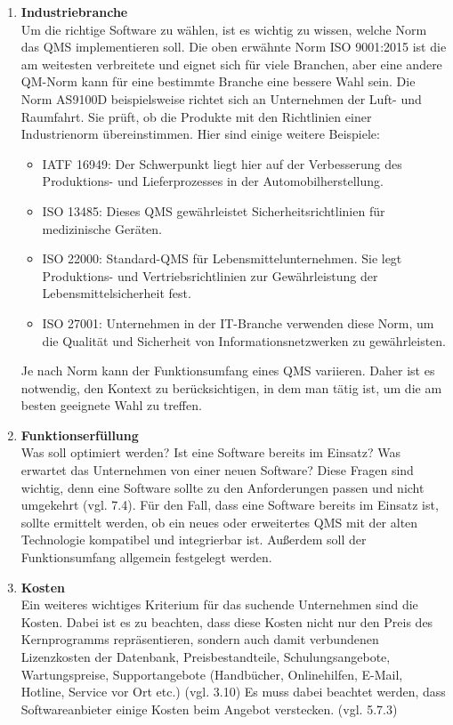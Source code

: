 \documentclass[11pt]{scrartcl}       %
\begin{document}
\begin{enumerate}

\item[] \textbf{Industriebranche} \\
Um die richtige Software zu wählen, ist es wichtig zu wissen, welche Norm das QMS implementieren soll. Die oben erwähnte Norm ISO 9001:2015 ist die am weitesten verbreitete und eignet sich für viele Branchen, aber eine andere QM-Norm kann für eine bestimmte Branche eine bessere Wahl sein. Die Norm AS9100D beispielsweise richtet sich an Unternehmen der Luft- und Raumfahrt. Sie prüft, ob die Produkte mit den Richtlinien einer Industrienorm übereinstimmen. Hier sind einige weitere Beispiele:

\begin{itemize}
\item IATF 16949: Der Schwerpunkt liegt hier auf der Verbesserung des Produktions- und Lieferprozesses in der Automobilherstellung.

\item ISO 13485: Dieses QMS gewährleistet Sicherheitsrichtlinien für medizinische Geräten.

\item ISO 22000: Standard-QMS für Lebensmittelunternehmen. Sie legt Produktions- und Vertriebsrichtlinien zur Gewährleistung der Lebensmittelsicherheit fest.

\item ISO 27001: Unternehmen in der IT-Branche verwenden diese Norm, um die Qualität und Sicherheit von Informationsnetzwerken zu gewährleisten.
\end{itemize}

Je nach Norm kann der Funktionsumfang eines QMS variieren. Daher ist es notwendig, den Kontext zu berücksichtigen, in dem man tätig ist, um die am besten geeignete Wahl zu treffen.

\item[] \textbf{Funktionserfüllung} \\
Was soll optimiert werden? Ist eine Software bereits im Einsatz? Was erwartet das Unternehmen von einer neuen Software? Diese Fragen sind wichtig, denn eine Software sollte zu den Anforderungen passen und nicht umgekehrt (vgl. \cite{gross2017professionelle} 7.4). Für den Fall, dass eine Software bereits im Einsatz ist, sollte ermittelt werden, ob ein neues oder erweitertes QMS mit der alten Technologie kompatibel und integrierbar ist. Außerdem soll der Funktionsumfang allgemein festgelegt werden.

\item[] \textbf{Kosten} \\
Ein weiteres wichtiges Kriterium für das suchende Unternehmen sind die Kosten. Dabei ist es zu beachten, dass diese Kosten nicht nur den Preis des Kernprogramms repräsentieren, sondern auch damit verbundenen Lizenzkosten der Datenbank, Preisbestandteile, Schulungsangebote, Wartungspreise, Supportangebote (Handbücher, Onlinehilfen, E-Mail, Hotline, Service vor Ort etc.) (vgl. \cite{gross2017professionelle} 3.10) Es muss dabei beachtet werden, dass Softwareanbieter einige Kosten beim Angebot verstecken. (vgl. \cite{teich2008richtige} 5.7.3)


\end{enumerate}
\end{document}
